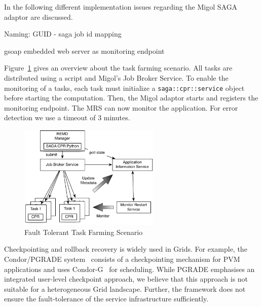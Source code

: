 \documentclass[times, 10pt,twocolumn]{article}
\begin{document}
In the following different implementation issues regarding the Migol SAGA adaptor are discussed.

\label{sec:saga_cpr_migol_adaptor}
                  
Naming: GUID - saga job id mapping

gsoap embedded web server as monitoring endpoint


\label{sec:exp}       

        
Figure~\ref{fig:saga-taskfarming} gives an overview about the task farming scenario. All tasks are
distributed using a script and Migol's Job Broker Service.
To enable the monitoring of a tasks, each task must initialize a \texttt{saga::cpr::service} object 
before starting the computation.  Then, the Migol adaptor starts and registers the monitoring endpoint. 
The MRS can now monitor the application.  For error detection we use a timeout of 3 minutes.
\begin{figure}[t]
    \centering
        \includegraphics[width=0.6\textwidth]{saga-taskfarming}
    \caption{Fault Tolerant Task Farming Scenario}
    \label{fig:saga-taskfarming}
\end{figure}

                                                                    
Checkpointing and rollback recovery is widely used in Grids. For example, the Condor/PGRADE system~\cite{DBLP:conf/eagc/KovacsK04} consists 
of a checkpointing mechanism for PVM applications and uses Condor-G~\cite{citeulike:291860} for scheduling. 
While PGRADE emphasises an integrated user-level checkpoint approach, we believe 
that this approach is not suitable for a heterogeneous Grid landscape. Further, 
the framework does not ensure the fault-tolerance of the
service infrastructure sufficiently.
                                 
\end{document}
